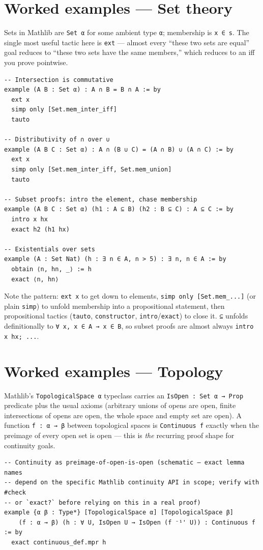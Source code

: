 \section{Worked examples --- Set theory}

Sets in Mathlib are \texttt{Set α} for some ambient type \texttt{α}; membership is \texttt{x ∈ s}. The single most useful tactic here is \texttt{ext} --- almost every ``these two sets are equal'' goal reduces to ``these two sets have the same members,'' which reduces to an iff you prove pointwise.

\begin{verbatim}
-- Intersection is commutative
example (A B : Set α) : A ∩ B = B ∩ A := by
  ext x
  simp only [Set.mem_inter_iff]
  tauto

-- Distributivity of ∩ over ∪
example (A B C : Set α) : A ∩ (B ∪ C) = (A ∩ B) ∪ (A ∩ C) := by
  ext x
  simp only [Set.mem_inter_iff, Set.mem_union]
  tauto

-- Subset proofs: intro the element, chase membership
example (A B C : Set α) (h1 : A ⊆ B) (h2 : B ⊆ C) : A ⊆ C := by
  intro x hx
  exact h2 (h1 hx)

-- Existentials over sets
example (A : Set Nat) (h : ∃ n ∈ A, n > 5) : ∃ n, n ∈ A := by
  obtain ⟨n, hn, _⟩ := h
  exact ⟨n, hn⟩
\end{verbatim}

Note the pattern: \texttt{ext x} to get down to elements, \texttt{simp only [Set.mem\_...]} (or plain \texttt{simp}) to unfold membership into a propositional statement, then propositional tactics (\texttt{tauto}, \texttt{constructor}, \texttt{intro}/\texttt{exact}) to close it. \texttt{⊆} unfolds definitionally to \texttt{∀ x, x ∈ A → x ∈ B}, so subset proofs are almost always \texttt{intro x hx; ...}.

\section{Worked examples --- Topology}

Mathlib's \texttt{TopologicalSpace α} typeclass carries an \texttt{IsOpen : Set α → Prop} predicate plus the usual axioms (arbitrary unions of opens are open, finite intersections of opens are open, the whole space and empty set are open). A function \texttt{f : α → β} between topological spaces is \texttt{Continuous f} exactly when the preimage of every open set is open --- this is \emph{the} recurring proof shape for continuity goals.

\begin{verbatim}
-- Continuity as preimage-of-open-is-open (schematic — exact lemma names
-- depend on the specific Mathlib continuity API in scope; verify with #check
-- or `exact?` before relying on this in a real proof)
example {α β : Type*} [TopologicalSpace α] [TopologicalSpace β]
    (f : α → β) (h : ∀ U, IsOpen U → IsOpen (f ⁻¹' U)) : Continuous f := by
  exact continuous_def.mpr h
\end{verbatim}

